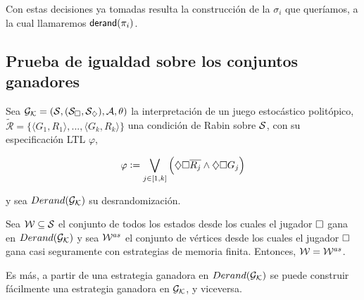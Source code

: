Con estas decisiones ya tomadas resulta la construcción de la $\sigma_i$ que
queríamos, a la cual llamaremos $\textsf{derand}(\pi_i)$.

\subsection{Prueba de igualdad sobre los conjuntos ganadores}

\begin{theorem}
	\label{teocuali}
	Sea $\mathcal{G}_{\mathcal{K}} = (\mathcal{S}, (\mathcal{S}_\square, \mathcal{S}_\diamondsuit), \mathcal{A}, \theta)$ la interpretación de un juego estocástico politópico, $\widetilde{\mathcal{R}} = \{ \langle G_1, R_1 \rangle, ..., \langle G_k, R_k \rangle \}$ una condición de Rabin sobre $\mathcal{S}$, con su especificación LTL $\varphi$,

	$$
		\varphi := \bigvee_{j \in [1, k]} \left( \diamondsuit \square \overline{R_j} \wedge \diamondsuit \square G_j \right)
	$$

	y sea $Derand(\mathcal{G}_{\mathcal{K}})$ su desrandomización.

	Sea $\mathcal{W} \subseteq \mathcal{S}$ el conjunto de todos los estados desde los cuales el
	jugador $\square$ gana en $Derand(\mathcal{G}_{\mathcal{K}})$ y sea $\mathcal{W}^{as}$ el conjunto de vértices desde
	los cuales el jugador $\square$ gana casi seguramente con estrategias de memoria
	finita. Entonces, $\mathcal{W} = \mathcal{W}^{as}$.

	Es más, a partir de una estrategia ganadora en $Derand(\mathcal{G}_{\mathcal{K}})$ se puede construir
	fácilmente una estrategia ganadora en $\mathcal{G}_{\mathcal{K}}$, y viceversa.
\end{theorem}


